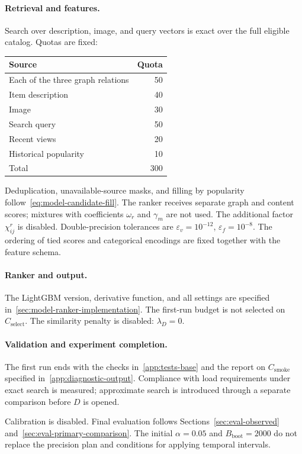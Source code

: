 \documentclass[12pt,a4paper]{article}
\newcommand{\eps}{\varepsilon}
\theoremstyle{plainru}
\begin{document}
\paragraph{Retrieval and features.}
Search over description, image, and query vectors is exact
over the full eligible catalog. Quotas are fixed:
\begin{center}
\begin{tabular}{L{0.63\textwidth}r}
\toprule Source & Quota \\\midrule
Each of the three graph relations & 50 \\
Item description & 40 \\
Image & 30 \\
Search query & 50 \\
Recent views & 20 \\
Historical popularity & 10 \\
\midrule Total & 300 \\
\bottomrule
\end{tabular}
\end{center}
Deduplication, unavailable-source masks, and filling
by popularity follow~\eqref{eq:model-candidate-fill}.
The ranker receives separate graph and content scores;
mixtures with coefficients $\omega_r$ and $\gamma_m$ are not used.
The additional factor $\chi_{ij}^r$ is disabled.
Double-precision tolerances are $\eps_v=10^{-12}$,
$\eps_f=10^{-8}$. The ordering of tied scores and categorical encodings
are fixed together with the feature schema.

\paragraph{Ranker and output.}
The LightGBM version, derivative function, and all settings are specified
in~\ref{sec:model-ranker-implementation}. The first-run budget
is not selected on $C_{\mathrm{select}}$. The similarity penalty is disabled: $\lambda_D=0$.

\paragraph{Validation and experiment completion.}
The first run ends with the checks in~\ref{app:tests-base}
and the report on $C_{\mathrm{smoke}}$ specified in~\ref{app:diagnostic-output}.
Compliance with load requirements under exact search is measured;
approximate search is introduced through a separate comparison before $D$ is opened.

Calibration is disabled. Final evaluation follows
Sections~\ref{sec:eval-observed} and~\ref{sec:eval-primary-comparison}.
The initial $\alpha=0.05$ and
$B_{\mathrm{boot}}=2000$ do not replace the precision plan and conditions
for applying temporal intervals.
\end{document}
